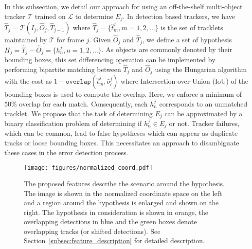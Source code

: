 \documentclass[letterpaper, 10 pt, journal, twoside]{IEEEtran}  %
\begin{document}
In this subsection, we detail our approach for using an off-the-shelf multi-object tracker $\mathcal{T}$ trained on $\mathcal{L}$ to determine $E_j$. In detection based trackers, we have $\hat{T}_j = \mathcal{T}(I_j,\hat{O}_j, \hat{T}_{j-1})$ where $\hat{T}_j = \{\hat{t}_m^j, m=1,2,\ldots\}$ is the set of tracklets maintained by $\mathcal{T}$ for frame $j$.
Given $\hat{O}_j$ and $\hat{T}_j$, we define a set of hypothesis $H_j = \hat{T}_j - \hat{O}_j = \{h_n^j, n=1,2,\ldots\}$. As objects are commonly denoted by their bounding boxes, this set differencing operation can be implemented by performing bipartite matching between $\hat{T}_j$ and $\hat{O}_j$ using the Hungarian algorithm with the cost as $1-\mathtt{overlap}(\hat{t}_m^j,\hat{o}_l^j)$ where Intersection-over-Union (IoU) of the bounding boxes is used to compute the overlap. Here, we enforce a minimum of $50\%$ overlap for each match. Consequently, each $h_n^j$ corresponds to an unmatched tracklet. We propose that the task of determining $E_j$ can be approximated by a binary classification problem of determining if $h_n^j \in E_j$ or not. Tracker failures, which can be common, lead to false hypotheses which can appear as duplicate tracks or loose bounding boxes. This necessitates an approach to disambiguate these cases in the error detection process. 

\begin{figure}[!th]
    \centering
    \texttt{[image: figures/normalized\_coord.pdf]}
    \caption{The proposed features describe the scenario around the hypothesis. The image is shown in the normalized coordinate space on the left and a region around the hypothesis is enlarged and shown on the right. The hypothesis in consideration is shown in orange, the overlapping detections in blue and the green boxes denote overlapping tracks (or shifted detections). See Section~\ref{subsec:feature_description} for detailed description.}
    \label{fig:features}
\end{figure}
\end{document}
